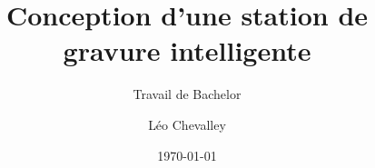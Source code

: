 \author{Léo Chevalley}

\setmale

\title{Conception d'une station de gravure intelligente}

\subtitle{Travail de Bachelor}


\date{\today}

